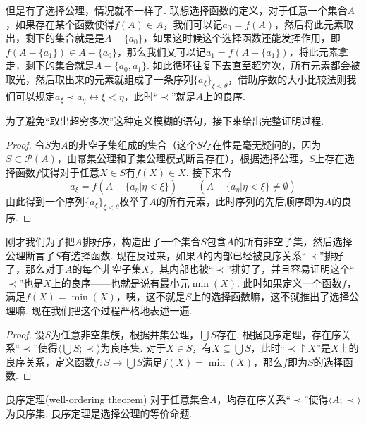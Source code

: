 但是有了选择公理，情况就不一样了. 联想选择函数的定义，对于任意一个集合\(A\)，如果存在某个函数使得\(f(A) \in A\)，我们可以记\(a_0 = f(A)\)，然后将此元素取出，剩下的集合就是是\(A-\{a_0\}\)，如果这时候这个选择函数还能发挥作用，即\(f(A-\{a_1\}) \in A-\{a_0\}\)，那么我们又可以记\(a_1 = f(A-\{a_1\})\)，将此元素拿走，剩下的集合就是\(A - \{a_0,a_1\}\). 如此循环往复下去直至超穷次，所有元素都会被取光，然后取出来的元素就组成了一条序列\(\{a_\xi\}_{\xi < \theta}\)，借助序数的大小比较法则我们可以规定\(a_\xi \prec a_\eta \leftrightarrow \xi < \eta\)，此时“\(\prec\)”就是\(A\)上的良序.

为了避免“取出超穷多次”这种定义模糊的语句，接下来给出完整证明过程.

\begin{proof}
    令\(S\)为\(A\)的非空子集组成的集合（这个\(S\)存在性是毫无疑问的，因为\(S \subset \mathcal{P}(A)\)，由幂集公理和子集公理模式断言存在），根据选择公理，\(S\)上存在选择函数\(f\)使得对于任意\(X \in S\)有\(f(X) \in X\). 接下来令
    \[a_\xi = f(A-\{a_\eta | \eta < \xi\}) \qquad (A-\{a_\eta | \eta < \xi\} \neq \emptyset)\]
    由此得到一个序列\(\{a_\xi\}_{\xi < \theta}\)枚举了\(A\)的所有元素，此时序列的先后顺序即为\(A\)的良序.
\end{proof}

刚才我们为了把\(A\)排好序，构造出了一个集合\(S\)包含\(A\)的所有非空子集，然后选择公理断言了\(S\)有选择函数. 现在反过来，如果\(A\)的内部已经被良序关系“\(\prec\)”排好了，那么对于\(A\)的每个非空子集\(X\)，其内部也被“\(\prec\)”排好了，并且容易证明这个“\(\prec\)”也是\(X\)上的良序——也就是说有最小元\(\min(X)\). 此时如果定义一个函数\(f\)，满足\(f(X)=\min(X)\)，咦，这不就是\(S\)上的选择函数嘛，这不就推出了选择公理嘛. 现在我们把这个过程严格地表述一遍.

\begin{proof}
    设\(S\)为任意非空集族，根据并集公理，\(\bigcup S\)存在. 根据良序定理，存在序关系“\(\prec\)”使得\(\langle \bigcup S; \prec \rangle\)为良序集. 对于\(X \in S\)，有\(X \subseteq \bigcup S\)，此时“\(\prec \upharpoonright X\)”是\(X\)上的良序关系，定义函数\(f: S \to \bigcup S\)满足\(f(X) = \min(X)\)，那么\(f\)即为\(S\)的选择函数.
\end{proof}

\begin{theorem}{良序定理(well-ordering theorem)}
    对于任意集合\(A\)，均存在序关系“\(\prec\)”使得\(\langle A; \prec \rangle\)为良序集. \newline
    良序定理是选择公理的等价命题.
\end{theorem}

